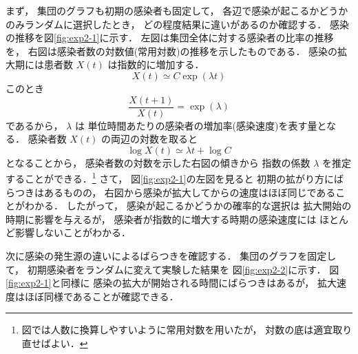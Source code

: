\documentclass[10pt,oneside]{scrartcl}
\begin{document}
まず，
集団のグラフも初期の感染者も固定して，
各辺で感染が起こるかどうかのみランダムに選択したとき，
どの程度結果に違いがあるのか確認する．
感染の推移を図\ref{fig:exp2-1}に示す．
左図は集団全体に対する感染者の比率の推移を，
右図は感染者数の対数値(常用対数)の推移を示したものである．
感染の拡大期には患者数 \(X(t)\) は指数的に増加する．
\begin{equation}
  X(t)\simeq C\exp(\lambda t)
\end{equation}
このとき
\begin{equation}
  \frac{X(t+1)}{X(t)}
  =\exp(\lambda)
\end{equation}
であるから，
\(\lambda\) は
単位時間あたりの感染者の増加率(感染速度)を表す量となる．
感染者数 \(X(t)\) の両辺の対数を取ると
\begin{equation}
  \log X(t) \simeq \lambda t + \log C
\end{equation}
となることから，
感染者数の対数を示した右図の傾きから
指数の係数 \(\lambda\) を推定することができる．\footnote{図では人数に換算しやすいように常用対数を用いたが，
対数の底は適宜取り直せばよい．}
さて，
図\ref{fig:exp2-1}の左図を見ると
初期の拡がり方にばらつきはあるものの，
右図から感染が拡大してからの速度はほぼ同じであることがわかる．
したがって，
感染が起こるかどうかの確率的な選択は
拡大開始の時期に影響を与えるが，
感染者が指数的に増大する時期の感染速度には
ほとんど影響しないことがわかる．

\begin{figure*}%
  \centering
\end{figure*}

次に感染の発生源の違いによるばらつきを確認する．
集団のグラフを固定して，
初期感染者をランダムに変えて実験した結果を
図\ref{fig:exp2-2}に示す．
図\ref{fig:exp2-1}と同様に
感染の拡大が開始される時間にばらつきはあるが，
拡大速度はほぼ同様であることが確認できる．

\begin{figure*}%
  \centering
\end{figure*}
\end{document}
